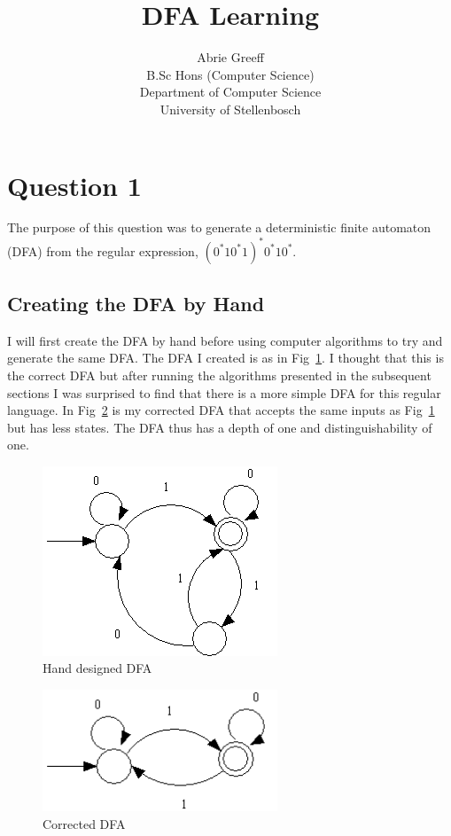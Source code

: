 \documentclass[a4paper,11pt,titlepage]{article}
\author{Abrie Greeff\\B.Sc Hons (Computer Science)\\Department of Computer Science\\University of Stellenbosch}
\title{DFA Learning}
\begin{document}
\maketitle
\tableofcontents

\section{Question 1}
The purpose of this question was to generate a deterministic finite automaton (DFA) from the regular expression, $(0^*10^*1)^*0^*10^*$.
\subsection{Creating the DFA by Hand}
I will first create the DFA by hand before using computer algorithms to try and generate the same DFA. The DFA I created is as in Fig~\ref{Fig:dfa1}. I thought that this is the correct DFA but after running the algorithms presented in the subsequent sections I was surprised to find that there is a more simple DFA for this regular language. In Fig~\ref{Fig:dfa2} is my corrected DFA that accepts the same inputs as Fig~\ref{Fig:dfa1} but has less states. The DFA thus has a depth of one and distinguishability of one.

\begin{figure}[htbp]
   \centering
   \includegraphics[width=7cm]{c1.png}
   \caption{Hand designed DFA}
   \label{Fig:dfa1}
\end{figure}

\begin{figure}[htbp]
   \centering
   \includegraphics[width=7cm]{tb4.png}
   \caption{Corrected DFA}
   \label{Fig:dfa2}
\end{figure}
\end{document}
